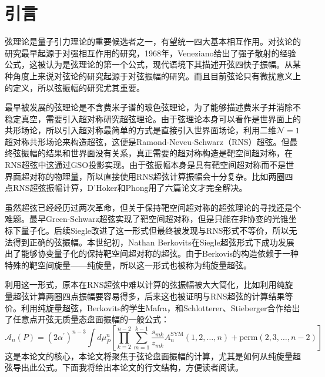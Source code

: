 \chapter{引言}
弦理论是量子引力理论的重要候选者之一，有望统一四大基本相互作用。对弦论的研究最早起源于对强相互作用的研究，1968年，Veneziano给出了强子散射的经验公式，这被认为是弦理论的第一个公式，现代语境下其描述开弦四快子振幅。从某种角度上来说对弦论的研究起源于对弦振幅的研究。而且目前弦论只有微扰意义上的定义，所以弦振幅的研究尤其重要\cite{berkovits2022snowmasswhitepaperstring}。

最早被发展的弦理论是不含费米子谱的玻色弦理论，为了能够描述费米子并消除不稳定真空，需要引入超对称研究超弦理论。由于弦理论本身可以看作是世界面上的共形场论，所以引入超对称最简单的方式是直接引入世界面场论，利用二维$\mathcal{N}=1$ 超对称共形场论来构造超弦，这便是Ramond-Neveu-Schwarz（RNS）超弦。但最终弦振幅的结果和世界面没有关系，真正需要的超对称构造是靶空间超对称，在RNS超弦中这通过GSO投影实现。由于弦振幅本身是具有靶空间超对称而不是世界面超对称的物理量，所以直接使用RNS超弦计算振幅会十分复杂。比如两圈四点RNS超弦振幅计算，D'Hoker和Phong用了六篇论文才完全解决\cite{DHoker:2001kkt,DHoker:2001qqx,DHoker:2001foj,DHoker:2001jaf,DHoker:2005dys,DHoker:2005vch,DHoker:2002hof}。

虽然超弦已经经历过两次革命，但关于保持靶空间超对称的超弦理论的寻找还是个难题。最早Green-Schwarz超弦\cite{Green:1983wt,Green:1983sg}实现了靶空间超对称，但是只能在非协变的光锥坐标下量子化。后续Siegle改进了这一形式\cite{Siegel:1985xj}但最终被发现与RNS形式不等价，所以无法得到正确的弦振幅。本世纪初，Nathan Berkovits在Siegle超弦形式下成功发展出了能够协变量子化的保持靶空间超对称的超弦\cite{Berkovits:2000fe}。由于Berkovis的构造依赖于一种特殊的靶空间旋量——纯旋量，所以这一形式也被称为纯旋量超弦。

利用这一形式，原本在RNS超弦中难以计算的弦振幅被大大简化，比如利用纯旋量超弦计算两圈四点振幅要容易得多\cite{Berkovits:2005df}，后来这也被证明与RNS超弦的计算结果等价\cite{Berkovits:2005ng}。利用纯旋量超弦，Berkovits的学生Mafra，和Schlotterer、Stieberger合作给出了任意点开弦无质量态盘面振幅的一般公式\cite{Mafra:2011nv,Mafra:2011nw}：
\begin{equation}
	\mathcal{A}_{n}(P)=(2\alpha^{\prime})^{n-3}\int d\mu_{P}^{n}\left[\prod_{k=2}^{n-2}\sum_{m=1}^{k-1}\frac{s_{mk}}{z_{mk}}A^{\text{SYM}}_{n}(1,2,\ldots,n)+\mathrm{perm}(2,3,\ldots,n-2)\right]
\end{equation}
这是本论文的核心，本论文将聚焦于弦论盘面振幅的计算，尤其是如何从纯旋量超弦导出此公式。下面我将给出本论文的行文结构，方便读者阅读。


